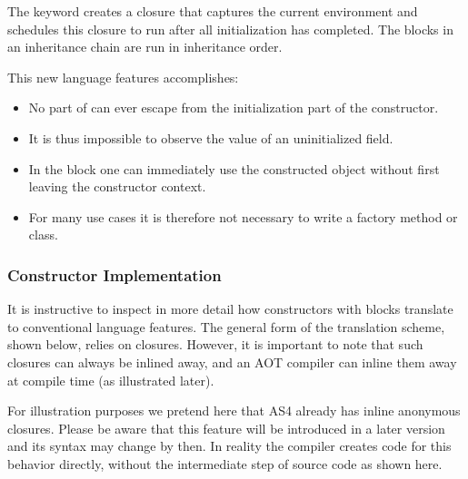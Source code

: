 The  keyword creates a closure that captures the current environment
and schedules this closure to run after all initialization has completed. The
 blocks in an inheritance chain are run in inheritance order.

This new language features accomplishes:
\begin{itemize}
  \item No part of  can ever escape from the initialization part of
  the constructor.
  \item It is thus impossible to observe the value of an uninitialized field.
  \item In the  block one can immediately use the constructed object
  without first leaving the constructor context.
  \item For many use cases it is therefore not necessary to write a factory
  method or class.
\end{itemize}

\subsubsection{Constructor Implementation}
It is instructive to inspect in more detail how constructors with 
blocks translate to conventional language features. The general form of the
translation scheme, shown below, relies on closures.
However, it is important to note that such closures can always be inlined away,
and an AOT compiler can inline them away at compile time (as illustrated later).

For illustration purposes we pretend here that AS4 already has inline anonymous
closures. Please be aware that this feature will be introduced in a later
version and its syntax may change by then. In reality the compiler creates code
for this behavior directly, without the intermediate step of source code as
shown here.

